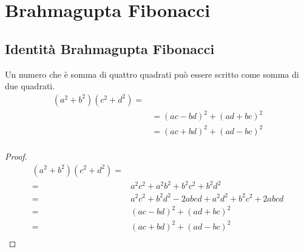 \chapter{Brahmagupta Fibonacci}\label{ch:brahmagupta-fibonacci}
\section{Identità Brahmagupta Fibonacci}\label{sec:identita-brahmagupta-fibonacci}
\begin{thm}\label{thm:Brahmagupta-Fibonacci}
Un numero che è somma di quattro quadrati può essere scritto come somma di due quadrati.
	\begin{align*}
	(a^2+b^2)(c^2+d^2)=&\\
	&=(ac-bd)^2+(ad+bc)^2\\
	&=(ac+bd)^2+(ad-bc)^2\\
	\end{align*}
\end{thm}
\begin{proof}
\begin{align*}
	(a^2+b^2)(c^2+d^2)=&\\
	=&a^2c^2+a^2b^2+b^2c^2+b^2d^2\\
	=&a^2c^2+b^2d^2-2abcd+a^2d^2+b^2c^2+2abcd\\
	=&(ac-bd)^2+(ad+bc)^2\\
	=&(ac+bd)^2+(ad-bc)^2\\
\end{align*}
\end{proof}